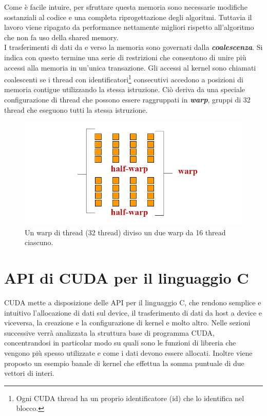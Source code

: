 Come è facile intuire, per sfruttare questa memoria sono necessarie modifiche sostanziali al codice e una completa riprogettazione degli algoritmi. Tuttavia il lavoro viene ripagato da performance nettamente migliori rispetto all'algoritmo che non fa uso della shared memory. \\
I trasferimenti di dati da e verso la memoria sono governati dalla \textit{\textbf{coalescenza}}. Si indica con questo termine una serie di restrizioni che consentono di unire più accessi alla memoria in un'unica transazione. Gli accessi al kernel sono chiamati coalescenti se i thread con identificatori\footnote{Ogni CUDA thread ha un proprio identificatore (id) che lo identifica nel blocco.} consecutivi accedono a posizioni di memoria contigue utilizzando la stessa istruzione. Ciò deriva da una speciale configurazione di thread che possono essere raggruppati in \textit{\textbf{warp}}, gruppi di 32 thread che eseguono tutti la stessa istruzione.
\begin{figure}[h!]
    \centering
    \includegraphics[scale=0.8]{img/cuda_warp.png}
    \caption{Un warp di thread (32 thread) diviso un due warp da 16 thread ciascuno.}
    \label{fig:cuda_warp}
\end{figure}

\section{API di CUDA per il linguaggio C}
\noindent CUDA mette a disposizione delle API per il linguaggio C, che rendono semplice e intuitivo l'allocazione di dati sul device, il trasferimento di dati da host a device e viceversa, la creazione e la configurazione di kernel e molto altro. Nelle sezioni successive verrà analizzata la struttura base di programma CUDA, concentrandosi in particolar modo su quali sono le funzioni di libreria che vengono più spesso utilizzate e come i dati devono essere allocati. Inoltre viene proposto un esempio banale di kernel che effettua la somma puntuale di due vettori di interi.

